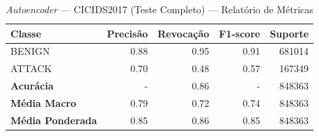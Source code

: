 \begin{table}[H]
    \centering
    \small
    \begin{tabular}{lrrrr}
        \hline
        Classe                   & Precisão & Revocação & F1-score & Suporte \\
        \hline
        BENIGN                   & 0.88     & 0.95      & 0.91     & 681014  \\
        ATTACK                   & 0.70     & 0.48      & 0.57     & 167349  \\
        \hline
        \textbf{Acurácia}        & -        & 0.86      & -        & 848363  \\
        \textbf{Média Macro}     & 0.79     & 0.72      & 0.74     & 848363  \\
        \textbf{Média Ponderada} & 0.85     & 0.86      & 0.85     & 848363  \\
        \hline
    \end{tabular}
    \caption{\textit{Autoencoder} — CICIDS2017 (Teste Completo) — Relatório de Métricas}
    \label{table:ae_cicids_completo_metricas}
\end{table}
